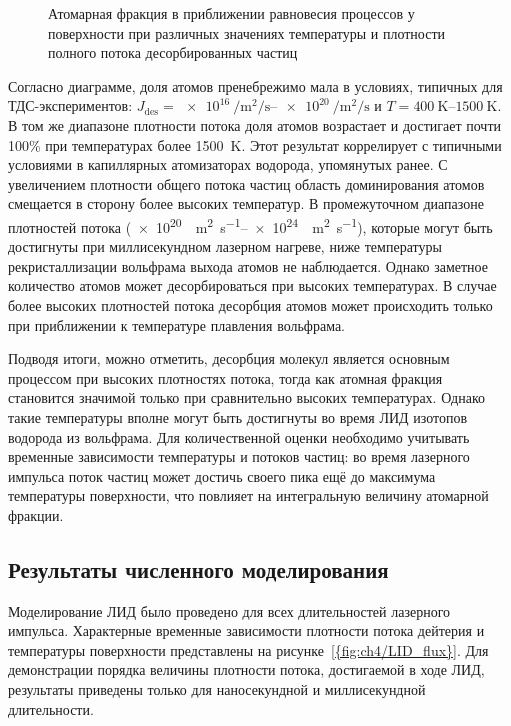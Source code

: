 \begin{figure}[ht]
    \caption{Атомарная фракция в приближении равновесия процессов у поверхности при различных значениях температуры и плотности полного потока десорбированных частиц}\label{fig:ch4/atomic_fraction_diagram}
\end{figure}

Согласно диаграмме, доля атомов пренебрежимо мала в условиях, типичных для ТДС-экспериментов: \(J_\mathrm{des} = \SIrange{e16}{e20}{\per\meter\squared\per\second}\) и \( T = \SIrange{400}{1500}{\kelvin} \). В том же диапазоне плотности потока доля атомов возрастает и достигает почти 100\% при температурах более \SI{1500}{\kelvin}. Этот результат коррелирует с типичными условиями в капиллярных атомизаторах водорода, упомянутых ранее. С увеличением плотности общего потока частиц область доминирования атомов смещается в сторону более высоких температур. В промежуточном диапазоне плотностей потока (\SIrange{e20}{e24}{\per\meter\squared\per\second}), которые могут быть достигнуты при миллисекундном лазерном нагреве, ниже температуры рекристаллизации вольфрама выхода атомов не наблюдается. Однако заметное количество атомов может десорбироваться при высоких температурах. В случае более высоких плотностей потока десорбция атомов может происходить только при приближении к температуре плавления вольфрама.

Подводя итоги, можно отметить, десорбция молекул является основным процессом при высоких плотностях потока, тогда как атомная фракция становится значимой только при сравнительно высоких температурах. Однако такие температуры вполне могут быть достигнуты во время ЛИД изотопов водорода из вольфрама. Для количественной оценки необходимо учитывать временные зависимости температуры и потоков частиц: во время лазерного импульса поток частиц может достичь своего пика ещё до максимума температуры поверхности, что повлияет на интегральную величину атомарной фракции.

\subsection{Результаты численного моделирования}\label{subsec:ch4/seс2/subsec3}

Моделирование ЛИД было проведено для всех длительностей лазерного импульса. Характерные временные зависимости плотности потока дейтерия и температуры поверхности  представлены на рисунке~\cref{{fig:ch4/LID_flux}}. Для демонстрации порядка величины плотности потока, достигаемой в ходе ЛИД, результаты приведены только для наносекундной и миллисекундной длительности.

